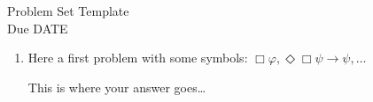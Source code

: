 \documentclass[12pt]{article}
\newcommand{\answer}[1]{%
  \par\noindent
  \begin{tcolorbox}[colback=gray!10, colframe=gray!80, title=Proof]
    #1
  \end{tcolorbox}
}
\begin{document}
\thispagestyle{empty}

\begin{center}
  \Large Problem Set Template\\[1ex] 
  Due DATE
  \vspace{.15in}
\end{center}



\begin{enumerate}[leftmargin=.75in]
  \item Here a first problem with some symbols: $\Box\varphi, \Diamond\Box\psi \rightarrow \psi,\ldots$
    \answer{
      This is where your answer goes\ldots
    }
\end{enumerate}



\vfill
\begin{small} %
  \singlespacing %
  \setlength{\bibsep}{0.5pt} %
  \thispagestyle{empty} %
\end{small} %
\end{document}
